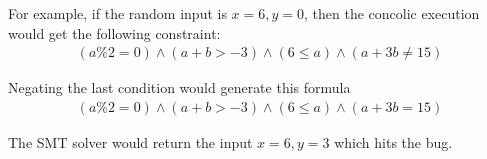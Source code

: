 \documentclass[12pt,a4paper]{article}
\begin{document}
\begin{enumerate}
\begin{enumerate}
For example, if the random input is $x = 6, y = 0$, then the concolic execution would get the following constraint:
\begin{align*}
(a\%2 = 0) \wedge (a + b > -3) \wedge (6 \leq a) \wedge (a + 3b \neq 15)
\end{align*}

Negating the last condition would generate this formula
\begin{align*}
(a\%2 = 0) \wedge (a + b > -3) \wedge (6 \leq a) \wedge (a + 3b = 15)
\end{align*}

The SMT solver would return the input $x = 6, y = 3$ which hits the bug. 

\color{black}

\end{enumerate}
\end{enumerate}





\end{document}
